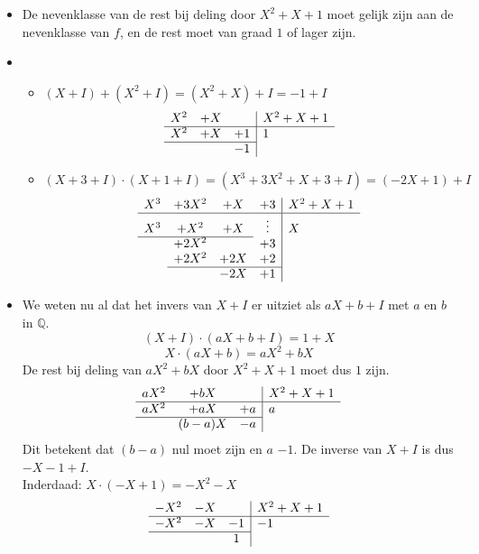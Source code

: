 \documentclass[main.tex]{subfiles}
\begin{document}
\begin{itemize}
\begin{itemize}
  \end{itemize}
\item De nevenklasse van de rest bij deling door $X^{2}+X+1$ moet gelijk zijn aan de nevenklasse van $f$, en de rest moet van graad $1$ of lager zijn.
\item
  \begin{itemize}
  \item $(X+I)+(X^{2}+I) = (X^{2}+X)+I = -1 +I$
    \[
    \begin{array}{ccc|l}
      X^{2} & +X &    & X^{2}+X+1\\ \hline
      X^{2} & +X & +1 & 1 \\\cline{1-3}
      &    & -1
    \end{array}
    \]
  \item $(X+3+I)\cdot (X+1+I) = (X^{3}+3X^{2}+X+3+I) = (-2X+1)+I$
    \[ 
    \begin{array}{cccc|l}
      X^{3} & +3X^{2} & +X & +3 & X^{2}+X+1\\ \hline
      X^{3} & + X^{2} & +X & \vdots & X \\\cline{1-3}
      & +2X^{2} &    & +3 & \\
      & +2X^{2} & +2X & +2 & \\\cline{2-4}
      &         & -2X & +1 & \\
    \end{array}
    \]
  \end{itemize}
\item We weten nu al dat het invers van $X+I$ er uitziet als $aX+b +I$ met $a$ en $b$ in $\mathbb{Q}$.
  \[ (X+I) \cdot (aX+b+I) = 1+X \]
  \[ X\cdot(aX+b) = aX^{2} +bX \]
  De rest bij deling van $aX^{2} +bX$ door $X^{2}+X+1$ moet dus $1$ zijn.
  \[
  \begin{array}{ccc|l}
    aX^{2} & +bX & & X^{2}+X+1\\\hline
    aX^{2} & +aX & +a & a \\\cline{1-3}
          & (b-a)X & -a &  \\ 
  \end{array}
  \]
  Dit betekent dat $(b-a)$ nul moet zijn en $a$ $-1$.
  De inverse van $X+I$ is dus $-X-1+I$.\\
  Inderdaad: $X\cdot(-X+1) = -X^{2}-X$
  \[
  \begin{array}{ccc|l}
    -X^{2} & -X & & X^{2}+X+1\\\hline
    -X^{2} & -X & -1 & -1\\\cline{1-3}
          &    &  1 & 
  \end{array}
  \]
\end{itemize}
\end{document}
